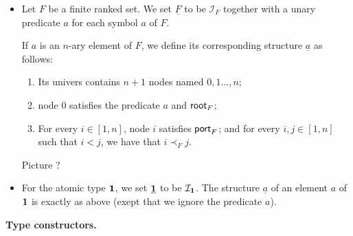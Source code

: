    \begin{itemize}
   \item Let $F$ be a finite ranked set.  We set $\underline F$ to be $\mathcal{I}_{F}$ together with a unary predicate $a$ for each symbol $a$ of $F$. 
            
            \noindent If $a$ is an $n$-ary element of $F$, we define its corresponding structure $\underline a$ as follows:
            \begin{enumerate}
            \item Its univers contains $n+1$ nodes named $0,1\dots,n$;
            \item node $0$ satisfies the predicate $a$ and $\mathsf{root}_{F}$;
            \item For every $i\in[1,n]$, node $i$ satisfies $\mathsf{port}_{F}$; and for every $i, j \in[1,n]$ such that $i< j$, we have that $i\prec_F j$.
            \end{enumerate}             
            \begin{center}
            Picture ?
            \end{center}
            \item For the atomic type $\mathbf{1}$, we set $\underline {\mathbf{1}}$ to be $\mathcal{I}_ {\mathbf{1}}$. The structure $\underline a$ of an element $a$ of $\mathbf{1}$ is exactly as above (exept that we ignore the predicate $a$).
        \end{itemize}
    {\bf Type constructors.}
    
